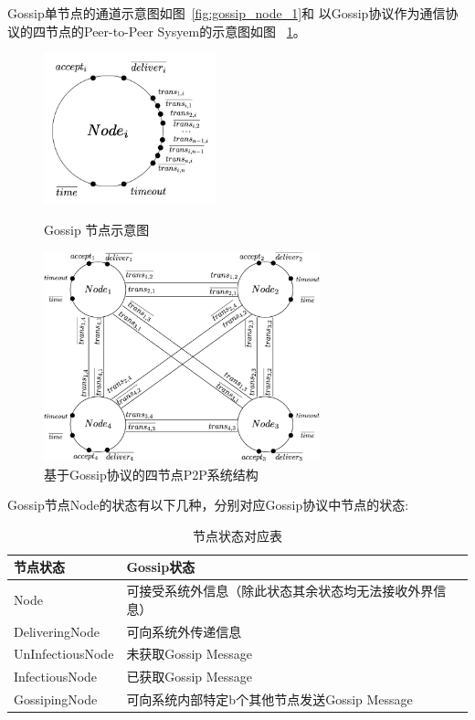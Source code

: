 Gossip单节点的通道示意图如图~\ref{fig:gossip_node_1}和
以Gossip协议作为通信协议的四节点的Peer-to-Peer Sysyem的示意图如图
~\ref{fig:p2p_system}。

\begin{figure}[!htp]
   \begin{minipage}{0.3\textwidth}
   \centering
   \includegraphics[width=5cm]{../figures/Node_gossip2.png}
   \caption{Gossip 节点示意图}
  \label{fig:gossip_node_1}
\end{minipage}\hfill
\begin{minipage}{0.6\textwidth}
   \includegraphics[width=8cm]{../figures/GossipSystem.png}
   \caption{基于Gossip协议的四节点P2P系统结构}
   \label{fig:p2p_system}
\end{minipage}
 \end{figure}

Gossip节点Node的状态有以下几种，分别对应Gossip协议中节点的状态:
\begin{table}[!hpt]
    \caption{节点状态对应表}
    \label{tab:firstone}
    \centering
    \begin{tabular}{@{}llr@{}} \toprule
      节点状态 & Gossip状态 \\ \midrule
      Node&可接受系统外信息（除此状态其余状态均无法接收外界信息）\\
      DeliveringNode&可向系统外传递信息\\
      UnInfectiousNode&未获取Gossip Message\\
      InfectiousNode&已获取Gossip Message\\
      GossipingNode&可向系统内部特定b个其他节点发送Gossip Message\\ \bottomrule
    \end{tabular}
  \end{table}

